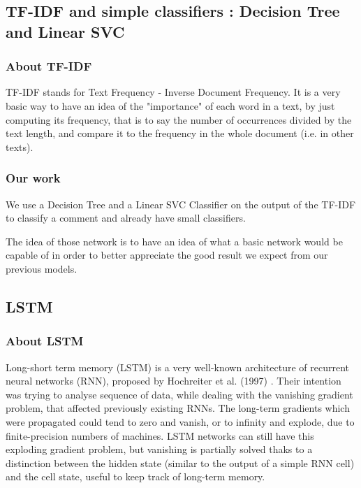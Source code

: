 \documentclass[11pt]{scrartcl}
\begin{document}
\subsection{TF-IDF and simple classifiers : Decision Tree and Linear SVC}

\subsubsection{About TF-IDF}

TF-IDF stands for Text Frequency - Inverse Document Frequency. It is a very basic way to have an idea of the "importance" of each word in a text, by just computing its frequency, that is to say the number of occurrences divided by the text length, and compare it to the frequency in the whole document (i.e. in other texts).



\subsubsection{Our work}

We use a Decision Tree and a Linear SVC Classifier on the output of the TF-IDF to classify a comment and already have small classifiers.

The idea of those network is to have an idea of what a basic network would be capable of in order to better appreciate the good result we expect from our previous models.

\subsection{LSTM}

\subsubsection{About LSTM}

Long-short term memory (LSTM) is a very well-known architecture of recurrent neural networks (RNN), proposed by Hochreiter et al. (1997) \cite{hochreiter1997long}. Their intention was trying to analyse sequence of data, while dealing with the vanishing gradient problem, that affected previously existing RNNs. The long-term gradients which were propagated could tend to zero and vanish, or to infinity and explode, due to finite-precision numbers of machines. LSTM networks can still have this exploding gradient problem, but vanishing is partially solved thaks to a distinction between the hidden state (similar to the output of a simple RNN cell) and the cell state, useful to keep track of long-term memory.
\end{document}
